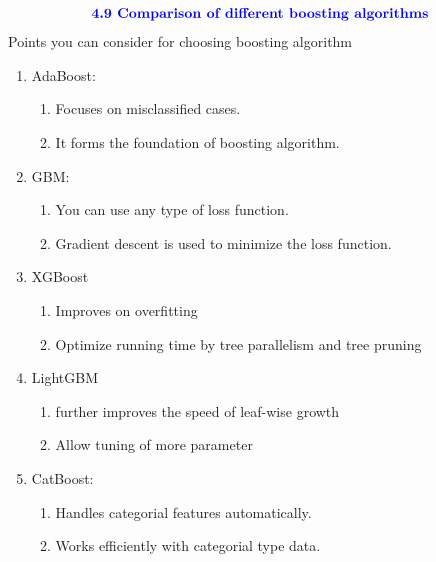 \documentclass{homework}
\begin{document}
\begin{align*}
    \textcolor{blue}{ \text{{\textbf{4.9 Comparison of different boosting algorithms}}}}
 \end{align*}
 Points you can consider for choosing boosting algorithm
\begin{enumerate}
    \item AdaBoost:
        \begin{enumerate}
            \item Focuses on misclassified cases.
            \item It forms the foundation of boosting algorithm.
        \end{enumerate}
    \item GBM:
        \begin{enumerate}
            \item You can use any type of loss function.
            \item Gradient descent is used to minimize the loss function.
        \end{enumerate}
    \item XGBoost
        \begin{enumerate}
            \item Improves on overfitting 
            \item Optimize running time by tree parallelism and tree pruning
        \end{enumerate}
    \item LightGBM
        \begin{enumerate}
            \item further improves the speed of leaf-wise growth
            \item Allow tuning of more parameter
        \end{enumerate}
    \item CatBoost:
        \begin{enumerate}
            \item Handles categorial features automatically.
            \item Works efficiently with categorial type data.
        \end{enumerate}
\end{enumerate}
\end{document}
